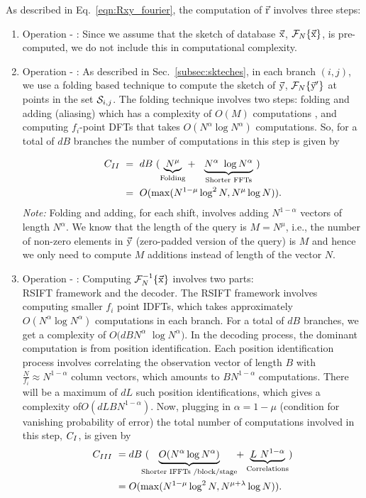 As described in Eq.~\ref{eqn:Rxy_fourier}, the computation of $\vec{\mathrm{r}}$ involves three steps:
\begin{enumerate}
	\item  Operation - :
	Since we assume that the sketch of database $\vec{\mathrm{x}}$, $\mathcal{F}_{N}\{\vec{\mathrm{x}}\}$, is pre-computed, we do not include this in computational complexity.

	\item  Operation - :
	As described in Sec.~\ref{subsec:skteches}, in each branch $(i,j)$, we use a folding based technique to compute the sketch of $\vec{\mathrm{y}}$, $\mathcal{F}_{N}\{\vec{\mathrm{y}}'\}$ at points in the set $\mathcal{S}_{i,j}$. The folding technique involves two steps: folding and adding (aliasing) which has a complexity of $O(M)$ computations , and computing $f_i$-point DFTs that takes $O(N^\alpha \log N^{\alpha})$ computations. So, for a total of $dB$ branches the number of computations in this step is given by
	
	\begin{align*}
	 C_{\RNum{2}} \ &= ~  dB ~
	( \underset{\text{Folding} }{\underbrace{N^{\mu}}} + \ \
	\underset{\text{Shorter FFTs} }{\underbrace{N^{\alpha} \ \log N^{\alpha}}} \ )\\
	&= ~O(\max(N^{1-\mu}\log^2 N ,N^{\mu}\log N)).
	\end{align*}
	{\textit{Note:}} Folding and adding, for each shift, involves adding $N^{1-\alpha}$ vectors of length $N^{\alpha}$. We know that the length of the query is $M =N^{\mu}$, i.e., the number of non-zero elements in $\vec{\mathrm{y}}$ (zero-padded version of the query) is $M$ and hence we only need to compute $M$ additions instead of length of the vector $N$.

	\item  Operation - :
	 Computing $\mathcal{F}_{N}^{-1}\{ \vec{\mathrm{x}} \}$ involves two parts:\\ RSIFT framework and the decoder. The RSIFT framework involves computing smaller $f_i$ point IDFTs, which takes approximately $O(N^{\alpha} \log N^{\alpha})$ computations in each branch. For a total of $dB$ branches, we get a complexity of $O(dB N^{\alpha}$ $\log N^{\alpha})$. In the decoding process, the dominant computation is from position identification. Each position identification process involves correlating the observation vector of length $B$ with $\frac{N}{f_i} \approx N^{1-\alpha}$ column vectors, which amounts to $B N^{1-\alpha}$ computations. There will be a maximum of $dL$ such position identifications, which gives a complexity of$O(dLBN^{1-\alpha} )$. Now, plugging in $\alpha = 1-\mu$ (condition for vanishing probability of error) the total number of computations involved in this step, $C_{\RNum{1}}$, is given by
	\begin{align*}	
	C_{\RNum{3}} \ &=  {d B}  ~(\hspace{-8pt}
	\underset{\text{Shorter IFFTs /block/stage} }{\underbrace{ O(N^{\alpha}  \log N^{\alpha})}} \hspace{-3pt}+ \underset{\text{Correlations} }{\underbrace{ L~N^{1-\alpha}}})
	\\
	&=  O(\max(N^{1-\mu}\log^2 N ,N^{\mu+\lambda}\log N)).
	\end{align*}


\end{enumerate}
